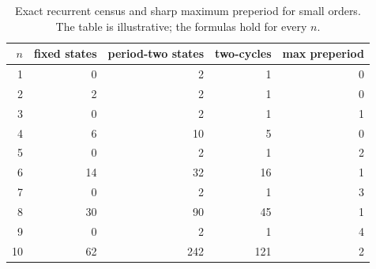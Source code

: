 \begin{table}[H]
\centering
\caption{Exact recurrent census and sharp maximum preperiod for small
orders.  The table is illustrative; the formulas hold for every \(n\).}
\label{tab:census}
\begin{tabular}{rrrrr}
\toprule
\(n\)& fixed states & period-two states & two-cycles & max preperiod\\
\midrule
1&0&2&1&0\\
2&2&2&1&0\\
3&0&2&1&1\\
4&6&10&5&0\\
5&0&2&1&2\\
6&14&32&16&1\\
7&0&2&1&3\\
8&30&90&45&1\\
9&0&2&1&4\\
10&62&242&121&2\\
\bottomrule
\end{tabular}
\end{table}
